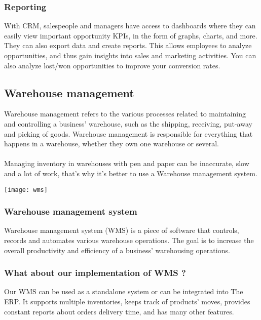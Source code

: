 \subsubsection{Reporting}
With CRM, salespeople and managers have access to dashboards where they can easily view
important opportunity KPIs, in the form of graphs, charts, and more. They can also export data and
create reports. This allows employees to analyze opportunities, and thus gain insights into sales and
marketing activities. You can also analyze lost/won opportunities to improve your conversion rates.
\newpage


\subsection{Warehouse management}
Warehouse management refers to the various processes related to maintaining and controlling a
business’ warehouse, such as the shipping, receiving, put-away and picking of goods. Warehouse
management is responsible for everything that happens in a warehouse, whether they own one
warehouse or several.\\\\
Managing inventory in warehouses with pen and paper can be inaccurate, slow and a lot of work,
that’s why it’s better to use a Warehouse management system.

\begin{center}
    \texttt{[image: wms]}
\end{center}

\subsubsection{Warehouse management system}
Warehouse management system (WMS) is a piece of software that controls, records and automates
various warehouse operations. The goal is to increase the overall productivity and efficiency of a
business’ warehousing operations.
\subsubsection{What about our implementation of WMS ?}
Our WMS can be used as a standalone system or can be integrated into The ERP. It supports multiple
inventories, keeps track of products’ moves, provides constant reports about orders delivery time, and
has many other features.
